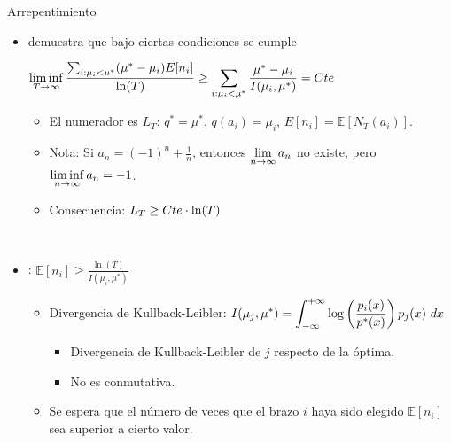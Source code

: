\documentclass[10pt, envcountsect, handout, aspectratio=1610, hyperref={hypertexnames=true}]{beamer}
\begin{document}
\begin{frame}{Arrepentimiento}

\begin{itemize}
\item \cite{Lai1985} demuestra que bajo ciertas condiciones se cumple

\hfil$
\displaystyle \liminf_{T\rightarrow \infty }\frac{\sum_{i: \mu_i < \mu^*} (\mu^* - \mu_i) E[n_i]}{\ln(T)} \geq \sum_{i: \mu_i < \mu^*} \frac{\mu^* - \mu_i}{I(\mu_i, \mu^*)} = Cte
$

\begin{itemize}
\item El numerador es $L_T$: $q^*=\mu^*$, $q(a_i)=\mu_i$, $E[n_i]=\mathbb{E}[N_T(a_i)]$.

\item Nota: Si \( a_n = (-1)^n + \frac{1}{n} \), entonces \( \displaystyle \lim_{n \to \infty} a_n \) no existe, pero \( \displaystyle \liminf_{n \to \infty} a_n = -1 \).

\item Consecuencia: {\large $\displaystyle L_T \geq Cte \cdot \ln(T)$}

\end{itemize}

~

\item {}: \hfil {\large $ \mathbb{E}[n_i] \geq
    \frac{ \ln(T) }{I(\mu_i, \mu^*)}  $  }

\begin{itemize}
\item Divergencia  de Kullback-Leibler: $\displaystyle I(\mu_j, \mu^*) = \displaystyle \int_{-\infty}^{+\infty} \log\left(\frac{p_i(x)}{p^*(x)}\right) p_j(x)\ dx$ 

	\begin{itemize}
	\item Divergencia  de Kullback-Leibler de $j$ respecto de la óptima.
	\item No es conmutativa.
	\end{itemize}
	
\item Se espera que el número de veces que el brazo $i$ haya sido elegido $ \mathbb{E}[n_i] $ sea superior a cierto valor.

\end{itemize}

\end{itemize}	


\end{frame}
\end{document}
